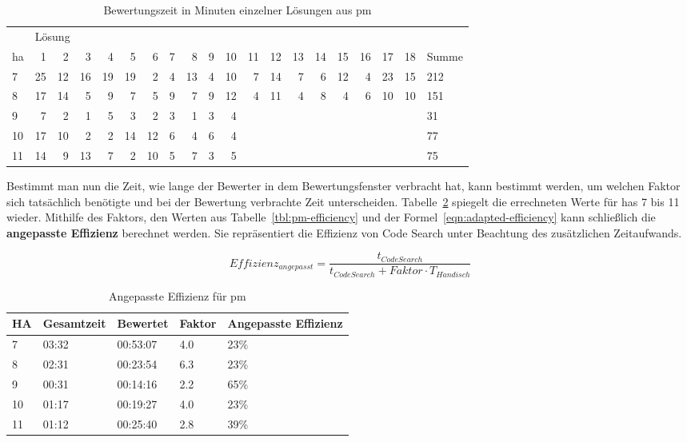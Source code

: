 \begin{table}
    \centering
    \caption{Bewertungszeit in Minuten einzelner Lösungen aus \ac{pm}}
    \begin{tabular}{|l|r|r|r|r|r|r|r|r|r|r|r|r|r|r|r|r|r|r|l|}
    \hline
        ~ & \multicolumn{18}{l|}{Lösung} & ~ \\
        \acs{ha} & 1  & 2  & 3  & 4  & 5  & 6  & 7 & 8  & 9 & 10 & 11 & 12 & 13 & 14 & 15 & 16 & 17 & 18 & Summe \\ \hline
        7  & 25 & 12 & 16 & 19 & 19 & 2  & 4 & 13 & 4 & 10 & 7  & 14 & 7  & 6  & 12 & 4  & 23 & 15 & 212   \\ \hline
        8  & 17 & 14 & 5  & 9  & 7  & 5  & 9 & 7  & 9 & 12 & 4  & 11 & 4  & 8  & 4  & 6  & 10 & 10 & 151   \\ \hline
        9  & 7  & 2  & 1  & 5  & 3  & 2  & 3 & 1  & 3 & 4  & ~  & ~  & ~  & ~  & ~  & ~  & ~  & ~  & 31    \\ \hline
        10 & 17 & 10 & 2  & 2  & 14 & 12 & 6 & 4  & 6 & 4  & ~  & ~  & ~  & ~  & ~  & ~  & ~  & ~  & 77    \\ \hline
        11 & 14 & 9  & 13 & 7  & 2  & 10 & 5 & 7  & 3 & 5  & ~  & ~  & ~  & ~  & ~  & ~  & ~  & ~  & 75    \\ \hline
    \end{tabular}
    \label{tbl:pm-overhead}
\end{table}

Bestimmt man nun die Zeit, wie lange der Bewerter in dem Bewertungsfenster verbracht hat, kann bestimmt werden, um welchen Faktor sich tatsächlich benötigte und bei der Bewertung verbrachte Zeit unterscheiden.
Tabelle~\ref{tbl:pm-adapted-efficiency} spiegelt die errechneten Werte für \acp{ha} 7 bis 11 wieder.
Mithilfe des Faktors, den Werten aus Tabelle~\ref{tbl:pm-efficiency} und der Formel~\ref{eqn:adapted-efficiency} kann schließlich die \textbf{angepasste Effizienz} berechnet werden.
Sie repräsentiert die Effizienz von Code Search unter Beachtung des zusätzlichen Zeitaufwands.

\begin{equation}\label{eqn:adapted-efficiency}
    Effizienz_{angepasst} = \frac{t_{Code Search}}{t_{Code Search} + Faktor \cdot T_{H\ddot{a}ndisch}}
\end{equation}

\begin{table}
    \centering
    \caption{Angepasste Effizienz für \ac{pm}}
    \begin{tabular}{|l|l|l|l|l|}
    \hline
        HA & Gesamtzeit  & Bewertet  & Faktor  & Angepasste Effizienz  \\ \hline
        7 & 03:32  & 00:53:07  & 4.0  & 23\%  \\ \hline
        8 & 02:31  & 00:23:54  & 6.3  & 23\%  \\ \hline
        9 & 00:31  & 00:14:16  & 2.2  & 65\%  \\ \hline
        10 & 01:17  & 00:19:27  & 4.0  & 23\%  \\ \hline
        11 & 01:12 & 00:25:40 & 2.8 & 39\% \\ \hline
    \end{tabular}
    \label{tbl:pm-adapted-efficiency}
\end{table}

